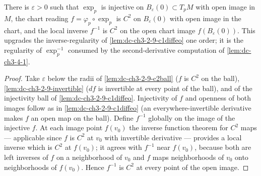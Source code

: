 \begin{lemma}
  \label{lem:dc-ch3-2-9-c2diffeo}


  There is $\varepsilon > 0$ such that $\exp_p$ is injective on
  $B_\varepsilon(0) \subset T_pM$ with open image in $M$, the chart reading
  $f = \varphi_p \circ \exp_p$ is $C^2$ on $B_\varepsilon(0)$ with open image
  in the chart, and the local inverse $f^{-1}$ is $C^2$ on the open chart
  image $f(B_\varepsilon(0))$. This upgrades the inverse-regularity of
  \cref{lem:dc-ch3-2-9-c1diffeo} one order; it is the regularity of
  $\exp_p^{-1}$ consumed by the second-derivative computation of
  \cref{lem:dc-ch3-4-1}.
\end{lemma}
\begin{proof}
  \sketch

  Take $\varepsilon$ below the radii of \cref{lem:dc-ch3-2-9-c2ball} ($f$ is
  $C^2$ on the ball), \cref{lem:dc-ch3-2-9-invertible} ($df$ is invertible at
  every point of the ball), and of the injectivity ball of
  \cref{lem:dc-ch3-2-9-c1diffeo}. Injectivity of $f$ and openness of both
  images follow as in \cref{lem:dc-ch3-2-9-c1diffeo} (an everywhere-invertible
  derivative makes $f$ an open map on the ball). Define $f^{-1}$ globally on
  the image of the injective $f$. At each image point $f(v_0)$ the inverse
  function theorem for $C^2$ maps — applicable since $f$ is $C^2$ at $v_0$
  with invertible derivative — provides a local inverse which is $C^2$ at
  $f(v_0)$; it agrees with $f^{-1}$ near $f(v_0)$, because both are left
  inverses of $f$ on a neighborhood of $v_0$ and $f$ maps neighborhoods of
  $v_0$ onto neighborhoods of $f(v_0)$. Hence $f^{-1}$ is $C^2$ at every
  point of the open image.
\end{proof}

